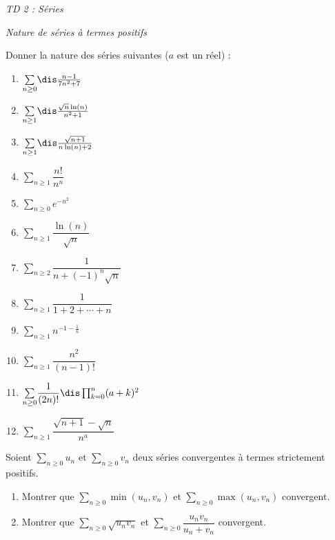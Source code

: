\documentclass[a4paper,10pt]{report}
\newcommand{\Sum}[2]{\ensuremath{\textstyle{\sum\limits_{#1}^{#2}}}}
\begin{document}
\everymath{\displaystyle}
\begin{center}
\textit{{ {\huge TD 2 : Séries}}}
\end{center}
\bigskip


\begin{center}
\textit{{ {\large Nature de séries à termes positifs}}}
\end{center}


\begin{Exa} Donner la nature des séries suivantes ($a$ est un réel) :
\begin{multicols}{3}
\begin{enumerate}
\item $\Sum{n \geq 0}{} \dis\frac{n-1}{7n^2+7}$
\item $\Sum{n \geq 1}{}\dis\frac{\sqrt{n}\ln(n)}{n^2+1}$
\item $\Sum{n \geq 1}{}\dis\frac{\sqrt{n+1}}{n\ln(n)+2}$ 
\item $\Sum{n \geq 1}{} \dfrac{n!}{n^n} $
\columnbreak
\item $\Sum{n \geq 0}{} e^{-n^2} $
\item $\Sum{n \geq 1}{} \dfrac{\ln(n)}{\sqrt{n}} $
\item $\Sum{n \geq 2}{} \dfrac{1}{n+(-1)^n \sqrt{n}} $
\item $\Sum{n \geq 1}{} \dfrac{1}{1+2+ \cdots + n} $
\columnbreak
\item $\Sum{n \geq 1}{} n^{-1- \frac{1}{n}} $
\item $\Sum{n \geq 1}{}  \dfrac{n^2}{(n-1)!} $
\item $\Sum{n \geq 0}{} \dfrac{1}{(2n)!} \dis \prod_{k=0}^n (a+k)^2$ 
\item $\Sum{n \geq 1}{} \dfrac{\sqrt{n+1}-\sqrt{n}}{n^a}$ 
\end{enumerate}
\end{multicols}

\vspace{0.05cm}

\end{Exa}


\begin{Exa} Soient $\Sum{n \geq 0}{} u_n$ et $\Sum{n \geq 0}{} v_n$ deux séries convergentes à termes strictement positifs.
\begin{enumerate}
\item Montrer que $\Sum{n \geq 0}{} \min(u_n,v_n)$ et $\Sum{n \geq 0}{} \max(u_n,v_n)$ convergent.
\item Montrer que $\Sum{n \geq 0}{} \sqrt{u_n v_n}$ et $\Sum{n \geq 0}{} \dfrac{u_n v_n}{u_n+v_n}$ convergent.
\end{enumerate}
\end{Exa}
\end{document}
